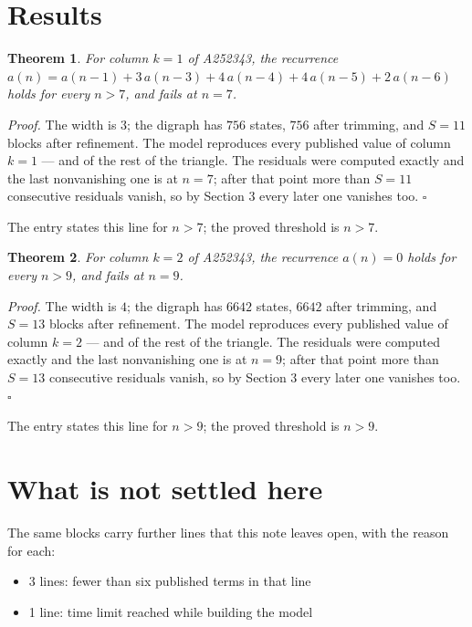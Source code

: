 \documentclass[11pt]{article}
\newtheorem{theorem}{Theorem}
\theoremstyle{definition}
\begin{document}
\section{Results}

\begin{theorem} For column $k = 1$ of A252343, the recurrence $a(n) = a(n-1) + 3\,a(n-3) + 4\,a(n-4) + 4\,a(n-5) + 2\,a(n-6)$ holds for every $n > 7$, and fails at $n = 7$.\end{theorem}

{\itshape Proof.} The width is $3$; the digraph has $756$ states, $756$ after trimming, and $S = 11$ blocks after refinement. The model reproduces every published value of column $k = 1$ --- and of the rest of the triangle. The residuals were computed exactly and the last nonvanishing one is at $n = 7$; after that point more than $S = 11$ consecutive residuals vanish, so by Section 3 every later one vanishes too. $\square$

The entry states this line for $n > 7$; the proved threshold is $n > 7$.

\begin{theorem} For column $k = 2$ of A252343, the recurrence $a(n) = 0$ holds for every $n > 9$, and fails at $n = 9$.\end{theorem}

{\itshape Proof.} The width is $4$; the digraph has $6642$ states, $6642$ after trimming, and $S = 13$ blocks after refinement. The model reproduces every published value of column $k = 2$ --- and of the rest of the triangle. The residuals were computed exactly and the last nonvanishing one is at $n = 9$; after that point more than $S = 13$ consecutive residuals vanish, so by Section 3 every later one vanishes too. $\square$

The entry states this line for $n > 9$; the proved threshold is $n > 9$.

\section{What is not settled here}

The same blocks carry further lines that this note leaves open, with the reason for each:

\begin{itemize}

\item 3 lines: fewer than six published terms in that line

\item 1 line: time limit reached while building the model

\end{itemize}
\end{document}
